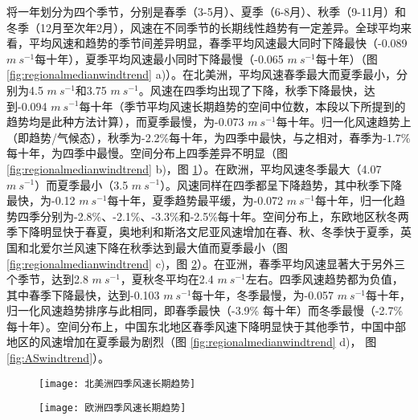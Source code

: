 将一年划分为四个季节，分别是春季（3-5月）、夏季（6-8月）、秋季（9-11月）和冬季（12月至次年2月），风速在不同季节的长期线性趋势有一定差异。全球平均来看，平均风速和趋势的季节间差异明显，春季平均风速最大同时下降最快（-0.089 $m ~ s^{-1}$每十年），夏季平均风速最小同时下降最慢（-0.065 $m ~ s^{-1}$每十年）（图 \ref{fig:regionalmedianwindtrend} a)）。在北美洲，平均风速春季最大而夏季最小，分别为4.5 $m ~ s^{-1}$和3.75 $m ~ s^{-1}$。风速在四季均出现了下降，秋季下降最快，达到-0.094 $m ~ s^{-1}$每十年（季节平均风速长期趋势的空间中位数，本段以下所提到的趋势均是此种方法计算），而夏季最慢，为-0.073 $m ~ s^{-1}$每十年。归一化风速趋势上（即趋势/气候态），秋季为-2.2\%每十年，为四季中最快，与之相对，春季为-1.7\%每十年，为四季中最慢。空间分布上四季差异不明显（图 \ref{fig:regionalmedianwindtrend} b)，图 \ref{fig:NAwindtrend}）。在欧洲，平均风速冬季最大（4.07 $m ~ s^{-1}$）而夏季最小（3.5 $m ~ s^{-1}$）。风速同样在四季都呈下降趋势，其中秋季下降最快，为-0.12 $m ~ s^{-1}$每十年，夏季趋势最平缓，为-0.072 $m ~ s^{-1}$每十年，归一化趋势四季分别为-2.8\%、-2.1\%、-3.3\%和-2.5\%每十年。空间分布上，东欧地区秋冬两季下降明显快于春夏，奥地利和斯洛文尼亚风速增加在春、秋、冬季快于夏季，英国和北爱尔兰风速下降在秋季达到最大值而夏季最小（图 \ref{fig:regionalmedianwindtrend} c)，图 \ref{fig:EUwindtrend}）。在亚洲，春季平均风速显著大于另外三个季节，达到2.8 $m ~ s^{-1}$，夏秋冬平均在2.4 $m ~ s^{-1}$左右。四季风速趋势都为负值，其中春季下降最快，达到-0.103 $m ~ s^{-1}$每十年，冬季最慢，为-0.057 $m ~ s^{-1}$每十年，归一化风速趋势排序与此相同，即春季最快（-3.9\% 每十年）而冬季最慢（-2.7\% 每十年）。空间分布上，中国东北地区春季风速下降明显快于其他季节，中国中部地区的风速增加在夏季最为剧烈（图 \ref{fig:regionalmedianwindtrend} d)， 图 \ref{fig:ASwindtrend}）。


\begin{figure}[!htbp]
    \centering
    \texttt{[image: 北美洲四季风速长期趋势]}
    \label{fig:NAwindtrend}
\end{figure}

\begin{figure}[!htbp]
    \centering
    \texttt{[image: 欧洲四季风速长期趋势]}
    \label{fig:EUwindtrend}
\end{figure}

